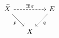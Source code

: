 \documentclass{article}
\begin{document}
    \begin{equation*}
        \begin{tikzcd}[column sep = 0.5cm]
            \widetilde{X} \ar[rr, "\ex!\sigma", dashed] \ar[dr, "p"'] & & E \ar[dl, "q"] \\
            & X
        \end{tikzcd}
    \end{equation*}
\end{document}
